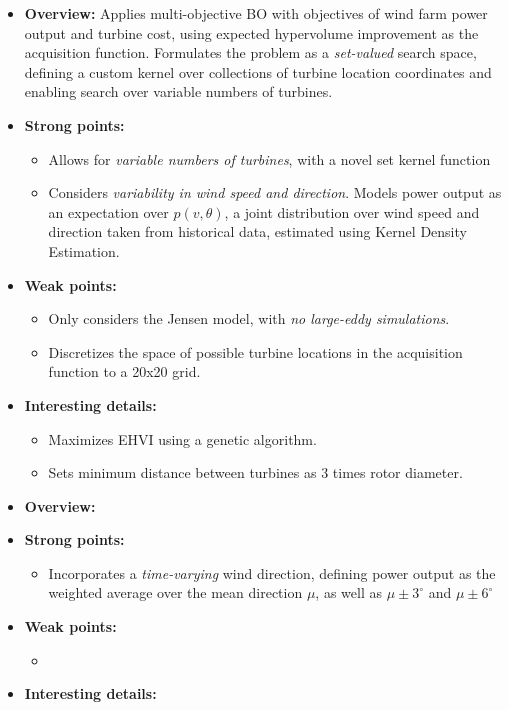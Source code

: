 \documentclass[12pt]{article}
\begin{document}
\begin{itemize}
    \item \textbf{Overview:}
        Applies multi-objective BO with objectives of wind farm power output
        and turbine cost, using expected hypervolume improvement as the
        acquisition function. Formulates the problem as a \emph{set-valued} search space,
        defining a custom kernel over collections of turbine location coordinates and
        enabling search over variable numbers of turbines.
    \item \textbf{Strong points:} 
        \begin{itemize}
            \item Allows for \emph{variable numbers of turbines}, with a novel set kernel function
            \item Considers \emph{variability in wind speed and direction}. Models power output as an expectation over $p(v, \theta)$, a
                joint distribution over wind speed and direction taken from
                historical data, estimated using Kernel Density Estimation.
        \end{itemize}
    \item \textbf{Weak points:} 
    \begin{itemize}
        \item Only considers the Jensen model, with \emph{no large-eddy simulations}.
        \item Discretizes the space of possible turbine locations in the acquisition function to a 20x20 grid.
    \end{itemize}
    \item \textbf{Interesting details:} 
    \begin{itemize}
        \item Maximizes EHVI using a genetic algorithm.
        \item Sets minimum distance between turbines as 3 times rotor diameter.
    \end{itemize}
\end{itemize}



\begin{itemize}
    \item \textbf{Overview:}
    \item \textbf{Strong points:} 
        \begin{itemize}
            \item Incorporates a \emph{time-varying} wind direction, defining power output as the
                weighted average over the mean direction $\mu$, as well as $\mu \pm 3^\circ$ and $\mu \pm 6^\circ$
        \end{itemize}
    \item \textbf{Weak points:} 
    \begin{itemize}
        \item 
    \end{itemize}
    \item \textbf{Interesting details:} 
\end{itemize}
\end{document}
